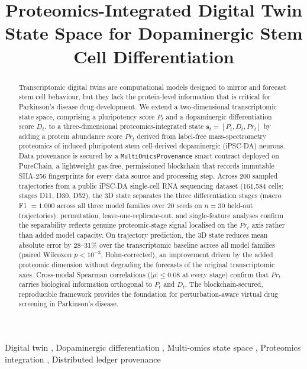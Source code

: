 \documentclass[5p,times,twocolumn]{elsarticle}
\begin{document}
\begin{frontmatter}

\title{Proteomics-Integrated Digital Twin State Space for Dopaminergic Stem Cell Differentiation}





\begin{abstract}
Transcriptomic digital twins are computational models designed
to mirror and forecast stem cell behaviour, but they lack the
protein-level information that is critical for Parkinson's
disease drug development.
We extend a two-dimensional transcriptomic state
space, comprising a pluripotency score $P_{t}$ and
a dopaminergic differentiation score $D_{t}$, to a
three-dimensional proteomics-integrated state
$\mathbf{s}_{t} = [P_{t}, D_{t}, Pr_{t}]$ by
adding a protein abundance score $Pr_{t}$ derived
from label-free mass-spectrometry proteomics of
induced pluripotent stem cell-derived dopaminergic
(iPSC-DA) neurons.
Data provenance is secured by a
\texttt{MultiOmicsProvenance} smart contract
deployed on PureChain, a lightweight gas-free, permissioned
blockchain that records immutable SHA-256
fingerprints for every data source and processing
step.
Across 200 sampled trajectories from a public
iPSC-DA single-cell RNA sequencing dataset
(161,584 cells; stages D11, D30, D52), the 3D
state separates the three differentiation stages
(macro F1 $= 1.000$ across all three model families
over 20 seeds on $n = 30$ held-out trajectories);
permutation, leave-one-replicate-out, and
single-feature analyses confirm the separability
reflects genuine proteomic-stage signal localised on
the $Pr_{t}$ axis rather than added model capacity.
On trajectory prediction, the 3D state reduces mean
absolute error by 28--31\% over the transcriptomic
baseline across all model families (paired Wilcoxon
$p < 10^{-3}$, Holm-corrected), an improvement driven
by the added proteomic dimension without degrading
the forecasts of the original transcriptomic axes.
Cross-modal Spearman correlations
($|\rho| \leq 0.08$ at every stage) confirm
that $Pr_{t}$ carries biological information
orthogonal to $P_{t}$ and $D_{t}$.
The blockchain-secured, reproducible framework
provides the foundation for perturbation-aware
virtual drug screening in Parkinson's disease.
\end{abstract}

\begin{keyword}
Digital twin \sep
Dopaminergic differentiation \sep
Multi-omics state space \sep
Proteomics integration \sep
Distributed ledger provenance
\end{keyword}

\end{frontmatter}
\end{document}
